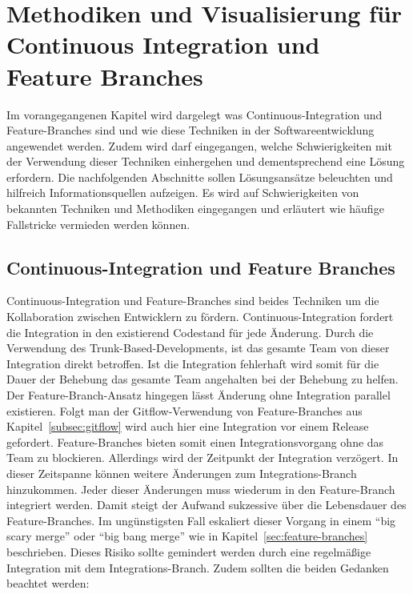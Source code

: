 \chapter{Methodiken und Visualisierung für Continuous Integration und Feature Branches}
\label{ch:visu_meth}

Im vorangegangenen Kapitel wird dargelegt was Continuous-Integration und Feature-Branches sind und wie diese Techniken in der Softwareentwicklung angewendet werden. Zudem wird darf eingegangen, welche Schwierigkeiten mit der Verwendung dieser Techniken einhergehen und dementsprechend eine Lösung erfordern. 
Die nachfolgenden Abschnitte sollen Lösungsansätze beleuchten und hilfreich Informationsquellen aufzeigen. Es wird auf Schwierigkeiten von bekannten Techniken und Methodiken eingegangen und erläutert wie häufige Fallstricke vermieden werden können.

\section{Continuous-Integration und Feature Branches}

Continuous-Integration und Feature-Branches sind beides Techniken um die Kollaboration zwischen Entwicklern zu fördern. Continuous-Integration fordert die Integration in den existierend Codestand für jede Änderung. Durch die Verwendung des Trunk-Based-Developments, ist das gesamte Team von dieser Integration direkt betroffen. Ist die Integration fehlerhaft wird somit für die Dauer der Behebung das gesamte Team angehalten bei der Behebung zu helfen. Der Feature-Branch-Ansatz hingegen lässt Änderung ohne Integration parallel existieren. Folgt man der Gitflow-Verwendung von Feature-Branches aus Kapitel~\ref{subsec:gitflow} wird auch hier eine Integration vor einem Release gefordert. Feature-Branches bieten somit einen Integrationsvorgang ohne das Team zu blockieren. Allerdings wird der Zeitpunkt der Integration verzögert. In dieser Zeitspanne können weitere Änderungen zum Integrations-Branch hinzukommen. Jeder dieser Änderungen muss wiederum in den Feature-Branch integriert werden. Damit steigt der Aufwand sukzessive über die Lebensdauer des Feature-Branches. Im ungünstigsten Fall eskaliert dieser Vorgang in einem ``big scary merge'' oder ``big bang merge'' wie in Kapitel~\ref{sec:feature-branches} beschrieben. Dieses Risiko sollte gemindert werden durch eine regelmäßige Integration mit dem Integrations-Branch. Zudem sollten die beiden Gedanken beachtet werden:\\

